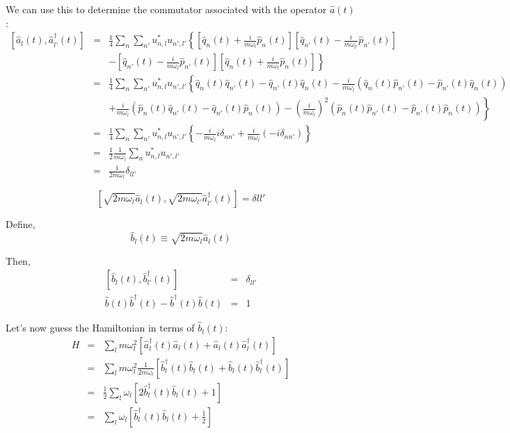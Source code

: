 \documentclass{article}
\begin{document}
We can use this to determine the commutator associated with the operator $\hat{a}(t)$:
\begin{eqnarray*}
       \left [ \hat{a}_l (t), \hat{a}^\dagger _{l'}(t) \right ] &=&   \frac{1}{4} \sum_n \sum_{n'} u^* _{n,l} u_{n',l'} \left \{  \left[ \hat{q}_n(t) + \frac{i}{m\omega_l}\hat{p}_n (t) \right] \left[ \hat{q}_{n'}(t) - \frac{i}{m\omega_{l'}}\hat{p}_{n'}(t) \right] \right. \\
       && \left. - \left[ \hat{q}_{n'}(t) - \frac{i}{m\omega_{l}}\hat{p}_{n'}(t) \right]\left[ \hat{q}_n(t) + \frac{i}{m\omega_l}\hat{p}_n (t) \right] \right \} \\
       &=& \frac{1}{4} \sum_n \sum_{n'}u^* _{n,l} u_{n',l'} \left \{ \hat{q}_n (t)\hat{q}_{n'} (t) - \hat{q}_{n'} (t) \hat{q}_n (t)  - \frac{i}{m\omega_l} \left( \hat{q}_n (t)\hat{p}_{n'} (t) - \hat{p}_{n'}(t) \hat{q}_n (t) \right) \right. \\
       && \left. + \frac{i}{m\omega_l} \left( \hat{p}_n (t)\hat{q}_{n'} (t) - \hat{q}_{n'}(t) \hat{p}_n (t) \right)  -\left(\frac{i}{m\omega_l}\right)^2 \left( \hat{p}_n (t)\hat{p}_{n'} (t) - \hat{p}_{n'}(t) \hat{p}_n (t) \right) \right \} \\
       &=& \frac{1}{4} \sum_n \sum_{n'}u^* _{n,l} u_{n',l'} \left \{ -\frac{i}{m \omega_l} i \delta_{nn'} + \frac{i}{m\omega_l} (-i \delta_{nn'})\right \} \\ 
       &=& \frac{1}{2} \frac{1}{m \omega_l} \sum_{n}u^* _{n,l} u_{n',l'} \\ 
       &=& \frac{1}{2m\omega_l} \delta_{ll'}
\end{eqnarray*}

\begin{equation*}
    \left[ \sqrt{2m\omega_l} \hat{a}_l (t), \sqrt{2m\omega_{l'}} \hat{a}^\dagger _{l'}(t) \right ] = \delta{ll'}
\end{equation*}

Define, 
\begin{equation*}
    \hat{b}_l (t) \equiv \sqrt{2m\omega_l} \hat{a}_l (t)
\end{equation*}

\newpage
Then,
\begin{eqnarray*}
     \left[ \hat{b}_l (t), \hat{b}^\dagger _{l'}(t) \right ] &=& \delta_{ll'} \\
      \hat{b}(t) \hat{b}^\dagger(t) -  \hat{b}^\dagger (t) \hat{b}(t) &=& 1  
\end{eqnarray*}

Let's now guess the Hamiltonian in terms of $\hat{b}_l (t)$:
\begin{eqnarray*}
    H &=& \sum_l m \omega _l ^2 \left [ \hat{a}_l ^\dagger (t) \hat{a}_l (t) + \hat{a}_l (t) \hat{a}_l ^\dagger (t)  \right ] \\
    &=& \sum_l m \omega _l ^2 \frac{1}{2m\omega_l} \left [ \hat{b}_l ^\dagger (t) \hat{b}_l (t) + \hat{b}_l (t) \hat{b}_l ^\dagger (t)  \right ] \\ 
    &=& \frac{1}{2} \sum_l \omega_l \left [ 2\hat{b}_l ^\dagger (t) \hat{b}_l (t) + 1 \right] \\
    &=& \sum_l \omega_l  \left [ \hat{b}_l ^\dagger (t) \hat{b}_l (t) + \frac{1}{2} \right] 
\end{eqnarray*}
\end{document}

